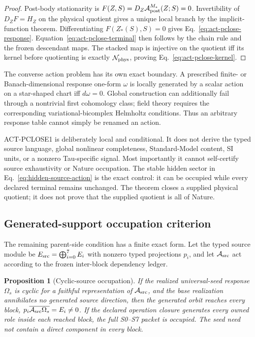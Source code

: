 \documentclass[11pt]{article}
\newtheorem{proposition}{Proposition}
\begin{document}
\begin{proof}
Post-body stationarity is
$F(Z,S)=D_Z\mathcal A_{\rm post}^{M_*}(Z;S)=0$.  Invertibility of
$D_ZF=H_Z$ on the physical quotient gives a unique local branch by the
implicit-function theorem.  Differentiating $F(Z_*(S),S)=0$ gives
Eq.~\eqref{eq:act-pclose-response}.  Equation~\eqref{eq:act-pclose-terminal}
then follows by the chain rule and the frozen descendant maps.  The stacked
map is injective on the quotient iff its kernel before quotienting is exactly
$\mathcal N_{\rm phys}$, proving Eq.~\eqref{eq:act-pclose-kernel}.
\end{proof}

The converse action problem has its own exact boundary.  A prescribed finite-
or Banach-dimensional response one-form $\omega$ is locally generated by a
scalar action on a star-shaped chart iff $d\omega=0$.  Global construction
can additionally fail through a nontrivial first cohomology class; field
theory requires the corresponding variational-bicomplex Helmholtz conditions.
Thus an arbitrary response table cannot simply be renamed an action.

ACT-PCLOSE1 is deliberately local and conditional.  It does not derive the
typed source language, global nonlinear completeness, Standard-Model content,
SI units, or a nonzero Tau-specific signal.  Most importantly it cannot
self-certify source exhaustivity or Nature occupation.  The stable hidden
sector in Eq.~\eqref{eq:hidden-source-action} is the exact control: it can be
occupied while every declared terminal remains unchanged.  The theorem closes
a supplied physical quotient; it does not prove that the supplied quotient is
all of Nature.

\subsection{Generated-support occupation criterion}

The remaining parent-side condition has a finite exact form. Let the typed
source module be $E_{\rm src}=\bigoplus_{i=0}^{7}E_i$ with nonzero typed
projections $p_i$, and let $\mathcal A_{\rm src}$ act according to the frozen
inter-block dependency ledger.

\begin{proposition}[Cyclic-source occupation]
\label{prop:cyclic-source-occupation}
If the realized universal-seed response $\Omega_s$ is cyclic for a faithful
representation of $\mathcal A_{\rm src}$, and the base realization annihilates
no generated source direction, then the generated orbit reaches every block,
$p_i\overline{\mathcal A_{\rm src}\Omega_s}=E_i\ne0$. If the declared
operation closure generates every owned role inside each reached block, the
full S0--S7 packet is occupied. The seed need not contain a direct component
in every block.
\end{proposition}
\end{document}

